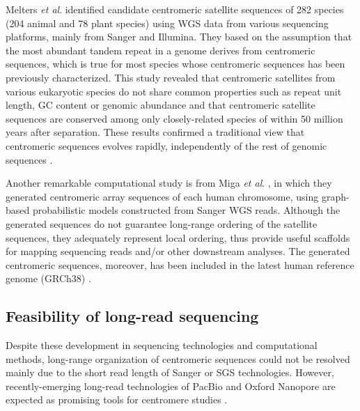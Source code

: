   Melters \textit{et al}. \cite{Melters2013} identified candidate centromeric satellite sequences of 282 species (204 animal and 78 plant species) using WGS data from various sequencing platforms, mainly from Sanger and Illumina. They based on the assumption that the most abundant tandem repeat in a genome derives from centromeric sequences, which is true for most species whose centromeric sequences has been previously characterized. This study revealed that centromeric satellites from various eukaryotic species do not share common properties such as repeat unit length, GC content or genomic abundance and that centromeric satellite sequences are conserved among only closely-related species of within 50 million years after separation. These results confirmed a traditional view that centromeric sequences evolves rapidly, independently of the rest of genomic sequences \cite{Henikoff2001}.

  Another remarkable computational study is from Miga \textit{et al}. \cite{Miga2014}, in which they generated centromeric array sequences of each human chromosome, using graph-based probabilistic models constructed from Sanger WGS reads. Although the generated sequences do not guarantee long-range ordering of the satellite sequences, they adequately represent local ordering, thus provide useful scaffolds for mapping sequencing reads and/or other downstream analyses. The generated centromeric sequences, moreover, has been included in the latest human reference genome (GRCh38) \cite{GenomeRef2013}.


\subsection*{Feasibility of long-read sequencing}
  Despite these development in sequencing technologies and computational methods, long-range organization of centromeric sequences could not be resolved mainly due to the short read length of Sanger or SGS technologies. However, recently-emerging long-read technologies of PacBio \cite{Eid2009} and Oxford Nanopore \cite{Jain2016} are expected as promising tools for centromere studies \cite{Aldrup-MacDonald2014, Miga2015}.

